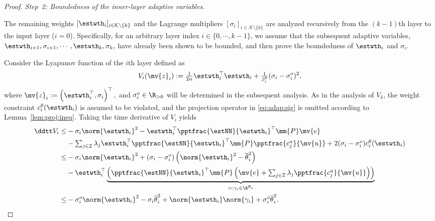 \documentclass[letterpaper, journal]{IEEEtran}
\begin{document}
\begin{proof}
\hfill

\textit{Step~2: Boundedness of the inner-layer adaptive variables.}

The remaining weights $[\estwth_i]_{i\in\mathcal{K}\setminus\{k\}}$ and the Lagrange multipliers $[\sigma_i]_{i\in\mathcal{K}\setminus\{k\}}$ are analyzed recursively from the $(k-1)$th layer to the input layer ($i=0$). 
Specifically, for an arbitrary layer index $i\in\{0,\cdots,k-1\}$, we assume that the subsequent adaptive variables, $\estwth_{i+1},\sigma_{i+1},\cdots,\estwth_k,\sigma_k,$ have already been shown to be bounded, and then prove the boundedness of $\estwth_i$ and $\sigma_i$.

Consider the Lyapunov function of the $i$th layer defined as
\begin{equation} \label{eq:Vi:def}
  V_{i}(\mv{z}_i)
  :=
  \tfrac{1}{2\alpha}\estwth_i^\top\estwth_i
  +
  \tfrac{1}{\beta_i^\theta}(\sigma_i-\sigma_i^o)^2
  ,
\end{equation}
where 
$
  \mv{z}_i:=
  \left(
    \estwth_i^\top,
    \sigma_i
  \right)^\top
  ,
$
and $\sigma_i^o\in\R_{>0}$ will be determined in the subsequent analysis.
As in the analysis of $V_k$, the weight constraint $c_i^{\theta}(\estwth_i)$ is assumed to be violated, and the projection operator in \eqref{eq:adap:sig} is omitted according to Lemma~\ref{lem:proj:ineq}.
Taking the time derivative of $V_i$ yields
\begin{align} \label{eq:Vi:dot:1} 
  \ddtt V_i
  \le&
    -\sigma_i \norm{\estwth_i}^2
    -
    \estwth_i^\top
    {\pptfrac{\estNN}{\estwth_i}}^\top
    \mm{P}
    \mv{e}
  \\ \nonumber
  &
    -
    \textstyle\sum_{j\in\mathcal{I}}
    \lambda_j 
    \estwth_i^\top
    {\pptfrac{\estNN}{\estwth_i}}^\top
    \mm{P}
    \pptfrac{c^{u}_{j}}{\mv{u}}
    +
    2(\sigma_i-\sigma_i^o) c_i^{\theta}(\estwth_i)
  \\ \nonumber
  \le&
    -\sigma_i \norm{\estwth_i}^2
    +
    (\sigma_i-\sigma_i^o) 
    \left(
      \norm{\estwth_i}^2
      -
      \overline{\theta}_i^2
    \right)
  \\ \nonumber
  &
    -
    \estwth_i^\top
    \underbrace{
    \left(
      {\pptfrac{\estNN}{\estwth_i}}^\top
      \mm{P}
      \left(
        \mv{e}
        +
        \textstyle\sum_{j\in\mathcal{I}}
        \lambda_j 
        \pptfrac{c^{u}_{j}}{\mv{u}}
      \right)
    \right)
    }_{=: \gamma_i\in\R^{\Xi_i}}
  \\ \nonumber
  \le&
    -\sigma_i^o \norm{\estwth_i}^2
    -\sigma_i \overline{\theta}_i^2
    +
    \norm{\estwth_i}
    \norm{\gamma_i}
    +
    \sigma_i^o \overline{\theta}_i^2
  .
\end{align}


\end{proof}
\end{document}
